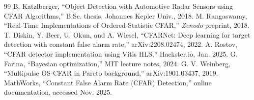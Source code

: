 \documentclass[conf]{new-aiaa}
\begin{document}
\begin{thebibliography}{99}
 B. Katzlberger, ``Object Detection with Automotive Radar Sensors using CFAR Algorithms,'' B.Sc. thesis, Johannes Kepler Univ., 2018.
 M. Rangaswamy, ``Real-Time Implementations of Ordered-Statistic CFAR,'' \emph{Zenodo} preprint, 2018.
 T. Diskin, Y. Beer, U. Okun, and A. Wiesel, ``CFARNet: Deep learning for target detection with constant false alarm rate,'' arXiv:2208.02474, 2022.
 A. Rostov, ``CFAR detector implementation using Vitis HLS,'' Hackster.io, Jan. 2025.
 G. Farina, ``Bayesian optimization,'' MIT lecture notes, 2024.
 G. V. Weinberg, ``Multipulse OS-CFAR in Pareto background,'' arXiv:1901.03437, 2019.
 MathWorks, ``Constant False Alarm Rate (CFAR) Detection,'' online documentation, accessed Nov. 2025.
\end{thebibliography}
\end{document}
